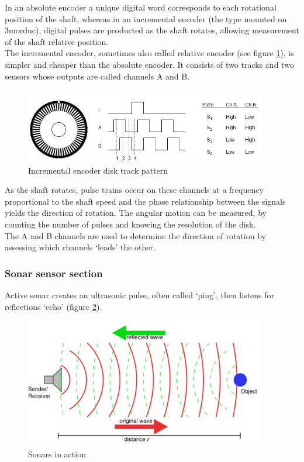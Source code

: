In an absolute encoder a unique digital word corresponds to each rotational
position of the shaft, whereas in an incremental encoder (the type mounted
on 3morduc), digital pulses are producted as the shaft rotates,
allowing measurement of the shaft relative position.
\\
The incremental encoder, sometimes also called relative encoder (see figure
\ref{fig:incremental_optical}), is simpler
and cheaper than the absolute encoder. It consists of two tracks and two
sensors whose outputs are called channels A and B.

\begin{figure}
  \begin{center}
    \includegraphics[width=300pt]{img/incremental_optical.jpg}
    \caption{Incremental encoder disk track pattern}
    \label{fig:incremental_optical}
  \end{center}
\end{figure}


As the shaft rotates, pulse trains occur on these channels at a frequency
proportional to the shaft speed and the phase relationship between the
signals yields the direction of rotation. The angular motion can be measured,
by counting the number of pulses and knowing the resolution of the disk.
\\
The A and B channels are used to determine the
direction of rotation by assessing which channels `leads' the other.

\subsubsection{Sonar sensor section}
\label{sec:3morduc:sonar}

Active sonar creates an ultrasonic pulse, often called `ping',
then listens for reflections `echo' (figure \ref{fig:sonar}).

\begin{figure}
  \begin{center}
    \includegraphics[width=300pt]{img/sonar.png}
    \caption{Sonars in action}
    \label{fig:sonar}
  \end{center}
\end{figure}


